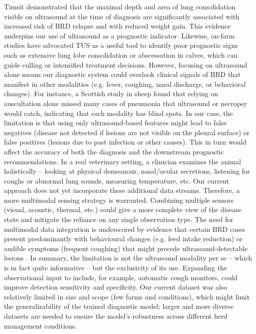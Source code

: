 Timsit \cite{timsit_association_2019} demonstrated that the maximal depth and area of lung consolidation visible on ultrasound at the time of diagnosis are significantly associated with increased risk of BRD relapse and with reduced weight gain. This evidence underpins our use of ultrasound as a prognostic indicator. Likewise, on-farm studies \cite{ollivett_-farm_2016} have advocated TUS as a useful tool to identify poor prognostic signs such as extensive lung lobe consolidation or abscessation in calves, which can guide culling or intensified treatment decisions. However, focusing on ultrasound alone means our diagnostic system could overlook clinical signals of BRD that manifest in other modalities (e.g. fever, coughing, nasal discharge, or behavioral changes). For instance, a Scottish study in sheep found that relying on auscultation alone missed many cases of pneumonia that ultrasound or necropsy would catch, indicating that each modality has blind spots. In our case, the limitation is that using only ultrasound-based features might lead to false negatives (disease not detected if lesions are not visible on the pleural surface) or false positives (lesions due to past infection or other causes). This in turn would affect the accuracy of both the diagnosis and the downstream prognostic recommendations. In a real veterinary setting, a clinician examines the animal holistically – looking at physical demeanour, nasal/ocular secretions, listening for coughs or abnormal lung sounds, measuring temperature, etc. Our current approach does not yet incorporate these additional data streams. Therefore, a more multimodal sensing strategy is warranted. Combining multiple sensors (visual, acoustic, thermal, etc.) could give a more complete view of the disease state and mitigate the reliance on any single observation type. The need for multimodal data integration is underscored by evidence that certain BRD cases present predominantly with behavioural changes (e.g. feed intake reduction) or audible symptoms (frequent coughing) that might precede ultrasound-detectable lesions \cite{carpentier2018automatic}. In summary, the limitation is not the ultrasound modality per se – which is in fact quite informative – but the exclusivity of its use. Expanding the observational input to include, for example, automatic cough monitors, could improve detection sensitivity and specificity. Our current dataset was also relatively limited in size and scope (few farms and conditions), which might limit the generalizability of the trained diagnostic model; larger and more diverse datasets are needed to ensure the model’s robustness across different herd management conditions.

